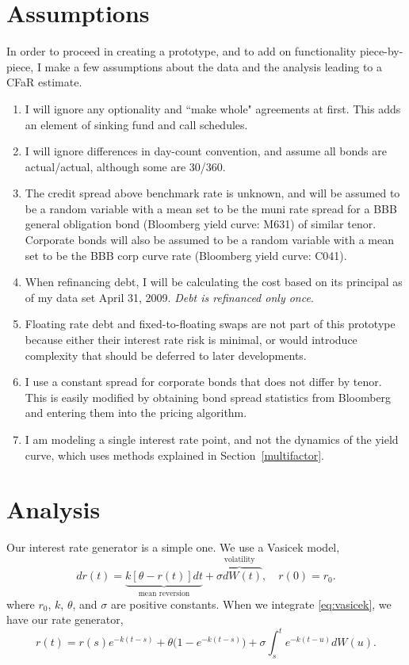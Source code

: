 \documentclass[11pt,twoside]{article}
\numberwithin{equation}{section}
\begin{document}


\section{Assumptions}
In order to proceed in creating a prototype, and to add on functionality piece-by-piece, I make a few assumptions about the data and the analysis leading to a CFaR estimate.
\begin{enumerate}
\item I will ignore any optionality and ``make whole" agreements at first. This adds an element of sinking fund and call schedules.
\item I will ignore differences in day-count convention, and assume all bonds are actual/actual, although some are 30/360.
\item The credit spread above benchmark rate is unknown, and will be assumed to be a random variable with a mean set to be the muni rate spread for a BBB general obligation bond (Bloomberg yield curve: M631) of similar tenor. Corporate bonds will also be assumed to be a random variable with a mean set to be the BBB corp curve rate (Bloomberg yield curve: C041).
\item When refinancing debt, I will be calculating the cost based on its principal as of my data set April 31, 2009. \emph{Debt is refinanced only once}.
\item Floating rate debt and fixed-to-floating swaps are not part of this prototype because either their interest rate risk is minimal, or would introduce complexity that should be deferred to later developments.
\item I use a constant spread for corporate bonds that does not differ by tenor. This is easily modified by obtaining bond spread statistics from Bloomberg and entering them into the pricing algorithm.
\item I am modeling a single interest rate point, and not the dynamics of the yield curve, which uses methods explained in Section~\ref{multifactor}.
\end{enumerate}

\section{Analysis}
Our interest rate generator is a simple one. We use a Vasicek model, %
\begin{equation}
dr(t)=\underbrace{k[\theta-r(t)]dt}_{\text{mean reversion}} + \overbrace{\sigma dW(t)}^{\text{volatility}}, \quad r(0)=r_0.
\label{eq:vasicek}
\end{equation}
where $r_0$, $k$, $\theta$, and $\sigma$ are positive constants. When we integrate \eqref{eq:vasicek}, we have our rate generator,
\begin{equation}
r(t)=r(s)e^{-k(t-s)} + \theta \big( 1-e^{-k(t-s)} \big) + \sigma \int^t_s e^{-k(t-u)} dW(u).
\label{eq:vasicek_integrated}
\end{equation}
\end{document}
